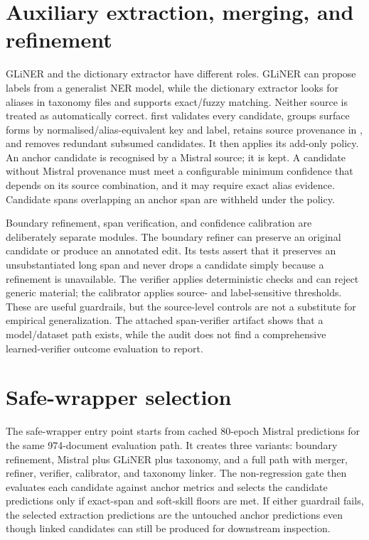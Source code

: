 \section{Auxiliary extraction, merging, and refinement}

GLiNER and the dictionary extractor have different roles. GLiNER can propose labels from a generalist NER model, while the dictionary extractor looks for aliases in taxonomy files and supports exact/fuzzy matching. Neither source is treated as automatically correct.  first validates every candidate, groups surface forms by normalised/alias-equivalent key and label, retains source provenance in , and removes redundant subsumed candidates. It then applies its add-only policy. An anchor candidate is recognised by a Mistral source; it is kept. A candidate without Mistral provenance must meet a configurable minimum confidence that depends on its source combination, and it may require exact alias evidence. Candidate spans overlapping an anchor span are withheld under the policy.

Boundary refinement, span verification, and confidence calibration are deliberately separate modules. The boundary refiner can preserve an original candidate or produce an annotated edit. Its tests assert that it preserves an unsubstantiated long span and never drops a candidate simply because a refinement is unavailable. The verifier applies deterministic checks and can reject generic material; the calibrator applies source- and label-sensitive thresholds. These are useful guardrails, but the source-level controls are not a substitute for empirical generalization. The attached span-verifier artifact shows that a model/dataset path exists, while the audit does not find a comprehensive learned-verifier outcome evaluation to report.

\section{Safe-wrapper selection}

The safe-wrapper entry point starts from cached 80-epoch Mistral predictions for the same 974-document evaluation path. It creates three variants: boundary refinement, Mistral plus GLiNER plus taxonomy, and a full path with merger, refiner, verifier, calibrator, and taxonomy linker. The non-regression gate then evaluates each candidate against anchor metrics and selects the candidate predictions only if exact-span and soft-skill floors are met. If either guardrail fails, the selected extraction predictions are the untouched anchor predictions even though linked candidates can still be produced for downstream inspection.

